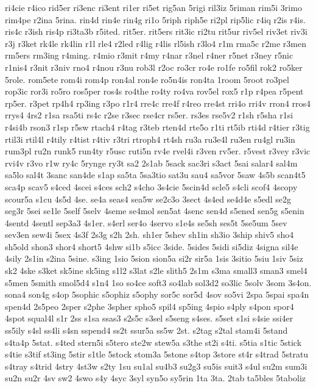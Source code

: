 {ri4cie
r4ico
rid5er
ri3enc
ri3ent
ri1er
ri5et
rig5an
5rigi
ril3iz
5riman
rim5i
3rimo
rim4pe
r2ina
5rina.
rin4d
rin4e
rin4g
ri1o
5riph
riph5e
ri2pl
rip5lic
r4iq
r2is
r4is.
ris4c
r3ish
ris4p
ri3ta3b
r5ited.
rit5er.
rit5ers
rit3ic
ri2tu
rit5ur
riv5el
riv3et
riv3i
r3j
r3ket
rk4le
rk4lin
r1l
rle4
r2led
r4lig
r4lis
rl5ish
r3lo4
r1m
rma5c
r2me
r3men
rm5ers
rm3ing
r4ming.
r4mio
r3mit
r4my
r4nar
r3nel
r4ner
r5net
r3ney
r5nic
r1nis4
r3nit
r3niv
rno4
r4nou
r3nu
rob3l
r2oc
ro3cr
ro4e
ro1fe
ro5fil
rok2
ro5ker
5role.
rom5ete
rom4i
rom4p
ron4al
ron4e
ro5n4is
ron4ta
1room
5root
ro3pel
rop3ic
ror3i
ro5ro
ros5per
ros4s
ro4the
ro4ty
ro4va
rov5el
rox5
r1p
r4pea
r5pent
rp5er.
r3pet
rp4h4
rp3ing
r3po
r1r4
rre4c
rre4f
r4reo
rre4st
rri4o
rri4v
rron4
rros4
rrys4
4rs2
r1sa
rsa5ti
rs4c
r2se
r3sec
rse4cr
rs5er.
rs3es
rse5v2
r1sh
r5sha
r1si
r4si4b
rson3
r1sp
r5sw
rtach4
r4tag
r3teb
rten4d
rte5o
r1ti
rt5ib
rti4d
r4tier
r3tig
rtil3i
rtil4l
r4tily
r4tist
r4tiv
r3tri
rtroph4
rt4sh
ru3a
ru3e4l
ru3en
ru4gl
ru3in
rum3pl
ru2n
runk5
run4ty
r5usc
ruti5n
rv4e
rvel4i
r3ven
rv5er.
r5vest
r3vey
r3vic
rvi4v
r3vo
r1w
ry4c
5rynge
ry3t
sa2
2s1ab
5sack
sac3ri
s3act
5sai
salar4
sal4m
sa5lo
sal4t
3sanc
san4de
s1ap
sa5ta
5sa3tio
sat3u
sau4
sa5vor
5saw
4s5b
scan4t5
sca4p
scav5
s4ced
4scei
s4ces
sch2
s4cho
3s4cie
5scin4d
scle5
s4cli
scof4
4scopy
scour5a
s1cu
4s5d
4se.
se4a
seas4
sea5w
se2c3o
3sect
4s4ed
se4d4e
s5edl
se2g
seg3r
5sei
se1le
5self
5selv
4seme
se4mol
sen5at
4senc
sen4d
s5ened
sen5g
s5enin
4sentd
4sentl
sep3a3
4s1er.
s4erl
ser4o
4servo
s1e4s
se5sh
ses5t
5se5um
5sev
sev3en
sew4i
5sex
4s3f
2s3g
s2h
2sh.
sh1er
5shev
sh1in
sh3io
3ship
shiv5
sho4
sh5old
shon3
shor4
short5
4shw
si1b
s5icc
3side.
5sides
5sidi
si5diz
4signa
sil4e
4sily
2s1in
s2ina
5sine.
s3ing
1sio
5sion
sion5a
si2r
sir5a
1sis
3sitio
5siu
1siv
5siz
sk2
4ske
s3ket
sk5ine
sk5ing
s1l2
s3lat
s2le
slith5
2s1m
s3ma
small3
sman3
smel4
s5men
5smith
smol5d4
s1n4
1so
so4ce
soft3
so4lab
sol3d2
so3lic
5solv
3som
3s4on.
sona4
son4g
s4op
5sophic
s5ophiz
s5ophy
sor5c
sor5d
4sov
so5vi
2spa
5spai
spa4n
spen4d
2s5peo
2sper
s2phe
3spher
spho5
spil4
sp5ing
4spio
s4ply
s4pon
spor4
4spot
squal4l
s1r
2ss
s1sa
ssas3
s2s5c
s3sel
s5seng
s4ses.
s5set
s1si
s4sie
ssi4er
ss5ily
s4sl
ss4li
s4sn
sspend4
ss2t
ssur5a
ss5w
2st.
s2tag
s2tal
stam4i
5stand
s4ta4p
5stat.
s4ted
stern5i
s5tero
ste2w
stew5a
s3the
st2i
s4ti.
s5tia
s1tic
5stick
s4tie
s3tif
st3ing
5stir
s1tle
5stock
stom3a
5stone
s4top
3store
st4r
s4trad
5stratu
s4tray
s4trid
4stry
4st3w
s2ty
1su
su1al
su4b3
su2g3
su5is
suit3
s4ul
su2m
sum3i
su2n
su2r
4sv
sw2
4swo
s4y
4syc
3syl
syn5o
sy5rin
1ta
3ta.
2tab
ta5bles
5taboliz
}
